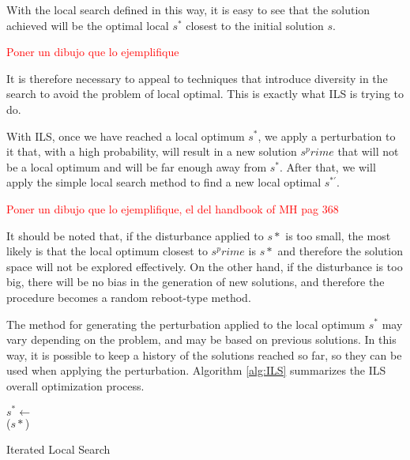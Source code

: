 \documentclass[review]{elsarticle}
\begin{document}
With the local search defined in this way, it is easy to see that the solution achieved will be the optimal local $s^*$ closest to the initial solution $s$. 

\textcolor{red}{Poner un dibujo que lo ejemplifique}

It is therefore necessary to appeal to techniques that introduce diversity in the search to avoid the problem of local optimal. This is exactly what ILS is trying to do.

With ILS, once we have reached a local optimum $s^*$, we apply a perturbation to it that, with a high probability, will result in a new solution $s^prime$ that will not be a local optimum and will be far enough away from $s^*$. After that, we will apply the simple local search method to find a new local optimal $s^{*\prime}$. 

\textcolor{red}{Poner un dibujo que lo ejemplifique, el del handbook of MH pag 368}

It should be noted that, if the disturbance applied to $s*$ is too small, the most likely is that the local optimum closest to $s^prime$ is $s*$ and therefore the solution space will not be explored effectively. On the other hand, if the disturbance is too big, there will be no bias in the generation of new solutions, and therefore the procedure becomes a random reboot-type method.


The method for generating the perturbation applied to the local optimum $s^*$ may vary depending on the problem, and may be based on previous solutions. In this way, it is possible to keep a history of the solutions reached so far, so they can be used when applying the perturbation. Algorithm \ref{alg:ILS} summarizes the ILS overall optimization process.

\begin{algorithm}
	\SetNlSkip{0.5em}
	\BlankLine
	$s^* \leftarrow$ \\
	\BlankLine
	\KwRet ($s*$)
	
	\caption{Iterated Local Search}\label{alg:ILS}
\end{algorithm}
\end{document}

